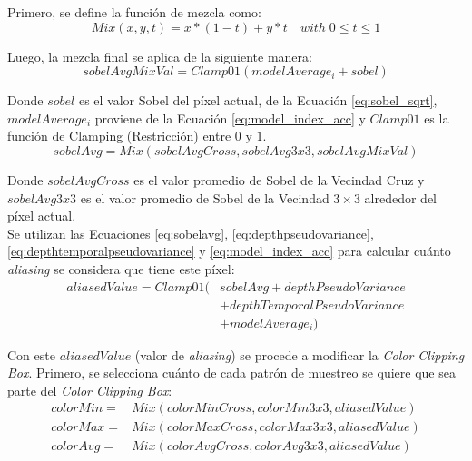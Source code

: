\documentclass[pregrado]{tesis-usb} %
\begin{document}
Primero, se define la función de mezcla como:
\begin{equation} \label{eq:mixfunction}
Mix(x,y,t)=x*(1-t)+y*t\quad with\; 0\leq t\leq 1
\end{equation} 

Luego, la mezcla final se aplica de la siguiente manera:
\begin{equation}\label{eq:sobelavgmixval}
sobelAvgMixVal=Clamp01(modelAverage_i+sobel) 
\end{equation}
 
Donde $sobel$ es el valor Sobel del píxel actual, de la Ecuación \ref{eq:sobel_sqrt}, $modelAverage_i$ proviene de la Ecuación \ref{eq:model_index_acc} y $Clamp01$ es la función de Clamping (Restricción) entre $0$ y $1$. \\

\begin{equation}\label{eq:sobelavg}
sobelAvg=Mix(sobelAvgCross, sobelAvg3x3, sobelAvgMixVal)
\end{equation}

Donde $sobelAvgCross$ es el valor promedio de Sobel de la Vecindad Cruz y $sobelAvg3x3$ es el valor promedio de Sobel de la Vecindad $3\times 3$ alrededor del píxel actual. \\ 

Se utilizan las Ecuaciones \ref{eq:sobelavg}, \ref{eq:depthpseudovariance}, \ref{eq:depthtemporalpseudovariance} y \ref{eq:model_index_acc} para calcular cuánto \textit{aliasing} se considera que tiene este píxel:
\begin{equation}\label{eq:aliasedvalue}
\begin{split}
aliasedValue=Clamp01 (& sobelAvg + depthPseudoVariance \\
 & + depthTemporalPseudoVariance \\
 & + modelAverage_i)
\end{split}
\end{equation}

Con este $aliasedValue$ (valor de \textit{aliasing}) se procede a modificar la \textit{Color Clipping Box}. Primero, se selecciona cuánto de cada patrón de muestreo se quiere que sea parte del \textit{Color Clipping Box}:
\begin{equation}\label{eq:newcolors}
\begin{split}
colorMin= & Mix(colorMinCross,colorMin3x3,aliasedValue) \\
colorMax= & Mix(colorMaxCross,colorMax3x3,aliasedValue) \\
colorAvg= & Mix(colorAvgCross,colorAvg3x3,aliasedValue) \\
\end{split}
\end{equation}
\end{document}
